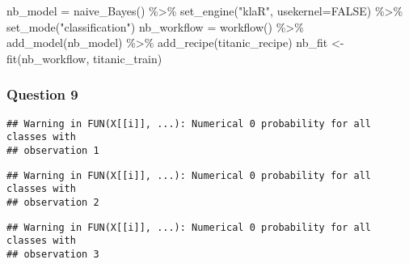 \documentclass[
]{article}
\newenvironment{Shaded}{\begin{snugshade}}{\end{snugshade}}
\newcommand{\AttributeTok}[1]{\textcolor[rgb]{0.77,0.63,0.00}{#1}}
\newcommand{\ConstantTok}[1]{\textcolor[rgb]{0.00,0.00,0.00}{#1}}
\newcommand{\FunctionTok}[1]{\textcolor[rgb]{0.00,0.00,0.00}{#1}}
\newcommand{\NormalTok}[1]{#1}
\newcommand{\OtherTok}[1]{\textcolor[rgb]{0.56,0.35,0.01}{#1}}
\newcommand{\SpecialCharTok}[1]{\textcolor[rgb]{0.00,0.00,0.00}{#1}}
\newcommand{\StringTok}[1]{\textcolor[rgb]{0.31,0.60,0.02}{#1}}
\begin{document}
\begin{Shaded}
\begin{Highlighting}[]
\NormalTok{nb\_model }\OtherTok{=} \FunctionTok{naive\_Bayes}\NormalTok{() }\SpecialCharTok{\%\textgreater{}\%}
  \FunctionTok{set\_engine}\NormalTok{(}\StringTok{"klaR"}\NormalTok{, }\AttributeTok{usekernel=}\ConstantTok{FALSE}\NormalTok{) }\SpecialCharTok{\%\textgreater{}\%}
  \FunctionTok{set\_mode}\NormalTok{(}\StringTok{"classification"}\NormalTok{)}
\NormalTok{nb\_workflow }\OtherTok{=} \FunctionTok{workflow}\NormalTok{() }\SpecialCharTok{\%\textgreater{}\%}
  \FunctionTok{add\_model}\NormalTok{(nb\_model) }\SpecialCharTok{\%\textgreater{}\%}
  \FunctionTok{add\_recipe}\NormalTok{(titanic\_recipe)}
\NormalTok{nb\_fit }\OtherTok{\textless{}{-}} \FunctionTok{fit}\NormalTok{(nb\_workflow, titanic\_train)}
\end{Highlighting}
\end{Shaded}

\hypertarget{question-9}{%
\subsubsection{Question 9}\label{question-9}}

\begin{Shaded}
\end{Shaded}

\begin{verbatim}
## Warning in FUN(X[[i]], ...): Numerical 0 probability for all classes with
## observation 1
\end{verbatim}

\begin{verbatim}
## Warning in FUN(X[[i]], ...): Numerical 0 probability for all classes with
## observation 2
\end{verbatim}

\begin{verbatim}
## Warning in FUN(X[[i]], ...): Numerical 0 probability for all classes with
## observation 3
\end{verbatim}
\end{document}
